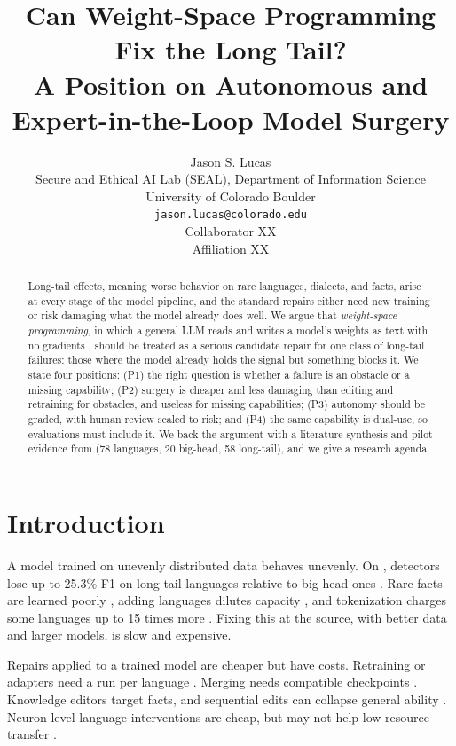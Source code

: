 \documentclass[11pt]{article}
\title{Can Weight-Space Programming Fix the Long Tail?\\
A Position on Autonomous and Expert-in-the-Loop Model Surgery}
\author{Jason S. Lucas \\
  Secure and Ethical AI Lab (SEAL), Department of Information Science \\
  University of Colorado Boulder \\
  \texttt{jason.lucas@colorado.edu} \\\And
  Collaborator XX \\
  Affiliation XX}
\begin{document}
\maketitle

\begin{abstract}
Long-tail effects, meaning worse behavior on rare languages, dialects, and facts, arise at every stage of the model pipeline, and the standard repairs either need new training or risk damaging what the model already does well. We argue that \emph{weight-space programming}, in which a general LLM reads and writes a model's weights as text with no gradients \citep{takehi2026weightspace}, should be treated as a serious candidate repair for one class of long-tail failures: those where the model already holds the signal but something blocks it. We state four positions: (P1) the right question is whether a failure is an obstacle or a missing capability; (P2) surgery is cheaper and less damaging than editing and retraining for obstacles, and useless for missing capabilities; (P3) autonomy should be graded, with human review scaled to risk; and (P4) the same capability is dual-use, so evaluations must include it. We back the argument with a literature synthesis and pilot evidence from \bluff{} (78 languages, 20 big-head, 58 long-tail), and we give a research agenda.
\end{abstract}

\section{Introduction}
A model trained on unevenly distributed data behaves unevenly. On \bluff{}, detectors lose up to 25.3\% F1 on long-tail languages relative to big-head ones \citep{lucas2026bluff}. Rare facts are learned poorly \citep{kandpal2023longtail}, adding languages dilutes capacity \citep{conneau2020xlmr,chang2024curse}, and tokenization charges some languages up to 15 times more \citep{petrov2023tokenizers}. Fixing this at the source, with better data and larger models, is slow and expensive.

Repairs applied to a trained model are cheaper but have costs. Retraining or adapters need a run per language \citep{pfeiffer2020madx}. Merging needs compatible checkpoints \citep{ilharco2023task,tao2024merging}. Knowledge editors target facts, and sequential edits can collapse general ability \citep{meng2022rome,meng2023memit,zhang2026revive}. Neuron-level language interventions are cheap, but may not help low-resource transfer \citep{tang2024lape,mondal2025neurons}.
\end{document}
